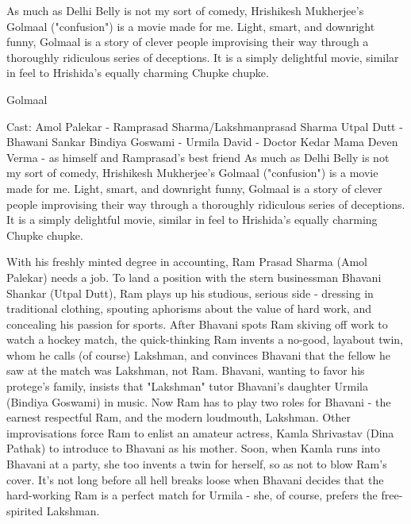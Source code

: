 \documentclass{article}
\begin{document}
As much as Delhi Belly is not my sort of comedy, Hrishikesh Mukherjee's Golmaal ("confusion")\cite{goolmaall} is a movie made for me.  Light, smart, and downright funny, Golmaal is a story of clever people improvising their way through a thoroughly ridiculous series of deceptions.  It is a simply delightful movie, similar in feel to Hrishida's equally charming Chupke chupke. 

\Large{Golmaal}

Cast:\newline
    Amol Palekar - Ramprasad Sharma/Lakshmanprasad Sharma\newline
    Utpal Dutt - Bhawani Sankar\newline
    Bindiya Goswami - Urmila\newline
    David - Doctor Kedar Mama\newline
    Deven Verma - as himself and Ramprasad's best friend\newline
\newline
As much as Delhi Belly is not my sort of comedy, Hrishikesh Mukherjee's Golmaal ("confusion") is a movie made for me.  Light, smart, and downright funny, Golmaal is a story of clever people improvising their way through a thoroughly ridiculous series of deceptions.  It is a simply delightful movie, similar in feel to Hrishida's equally charming Chupke chupke. 


With his freshly minted degree in accounting, Ram Prasad Sharma (Amol Palekar) needs a job.  To land a position with the stern businessman Bhavani Shankar (Utpal Dutt), Ram plays up his studious, serious side - dressing in traditional clothing, spouting aphorisms about the value of hard work, and concealing his passion for sports.  After Bhavani spots Ram skiving off work to watch a hockey match, the quick-thinking Ram invents a no-good, layabout twin, whom he calls (of course) Lakshman, and convinces Bhavani that the fellow he saw at the match was Lakshman, not Ram.  Bhavani, wanting to favor his protege's family, insists that "Lakshman" tutor Bhavani's daughter Urmila (Bindiya Goswami) in music.  Now Ram has to play two roles for Bhavani - the earnest respectful Ram, and the modern loudmouth, Lakshman.  Other improvisations force Ram to enlist an amateur actress, Kamla Shrivastav (Dina Pathak) to introduce to Bhavani as his mother\cite{movie}.  Soon, when Kamla runs into Bhavani at a party, she too invents a twin for herself, so as not to blow Ram's cover.  It's not long before all hell breaks loose when Bhavani decides that the hard-working Ram is a perfect match for Urmila - she, of course, prefers the free-spirited Lakshman.
\end{document}
